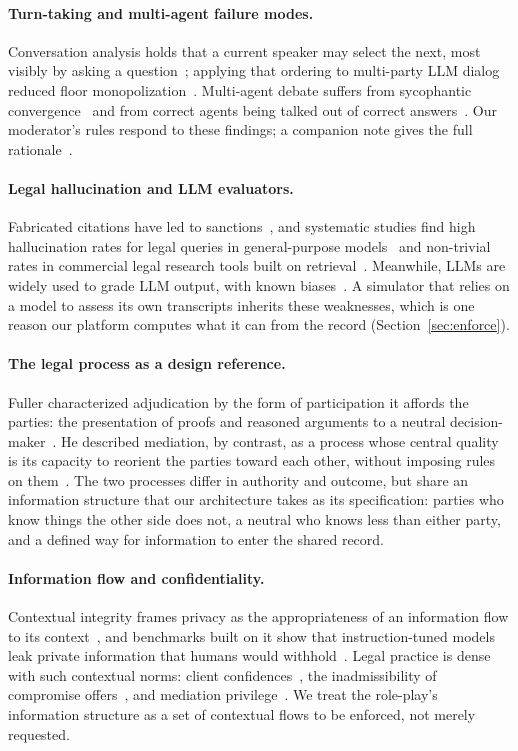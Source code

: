 \documentclass[acmsmall,screen,review]{acmart}
\begin{document}
\paragraph{Turn-taking and multi-agent failure modes.}
Conversation analysis holds that a current speaker may select the next, most visibly by asking a question~\cite{sacks1974turntaking}; applying that ordering to multi-party LLM dialog reduced floor monopolization~\cite{nonomura2025whospeaks}. Multi-agent debate suffers from sycophantic convergence~\cite{yao2025peacemaker,sharma2024sycophancy} and from correct agents being talked out of correct answers~\cite{wynn2025talk}. Our moderator's rules respond to these findings; a companion note gives the full rationale~\cite{gong2026moderation}.

\paragraph{Legal hallucination and LLM evaluators.}
Fabricated citations have led to sanctions~\cite{mata2023}, and systematic studies find high hallucination rates for legal queries in general-purpose models~\cite{dahl2024fictions} and non-trivial rates in commercial legal research tools built on retrieval~\cite{magesh2025hallucination,lewis2020rag}. Meanwhile, LLMs are widely used to grade LLM output, with known biases~\cite{zheng2023judge}. A simulator that relies on a model to assess its own transcripts inherits these weaknesses, which is one reason our platform computes what it can from the record (Section~\ref{sec:enforce}).

\paragraph{The legal process as a design reference.}
Fuller characterized adjudication by the form of participation it affords the parties: the presentation of proofs and reasoned arguments to a neutral decision-maker~\cite{fuller1978forms}. He described mediation, by contrast, as a process whose central quality is its capacity to reorient the parties toward each other, without imposing rules on them~\cite{fuller1971mediation}. The two processes differ in authority and outcome, but share an information structure that our architecture takes as its specification: parties who know things the other side does not, a neutral who knows less than either party, and a defined way for information to enter the shared record.

\paragraph{Information flow and confidentiality.}
Contextual integrity frames privacy as the appropriateness of an information flow to its context~\cite{nissenbaum2004privacy}, and benchmarks built on it show that instruction-tuned models leak private information that humans would withhold~\cite{mireshghallah2024secret}. Legal practice is dense with such contextual norms: client confidences~\cite{modelrule16}, the inadmissibility of compromise offers~\cite{fre408}, and mediation privilege~\cite{uma2001}. We treat the role-play's information structure as a set of contextual flows to be enforced, not merely requested.
\end{document}
